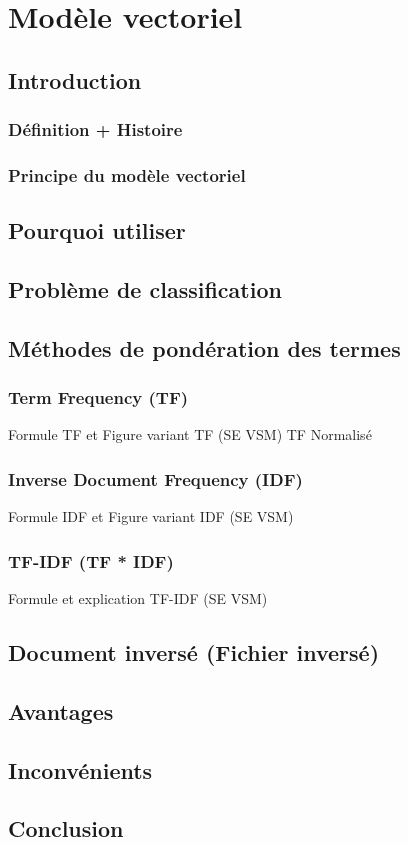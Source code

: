\section{Modèle vectoriel}
\subsection{Introduction}
\subsubsection{Définition + Histoire}
\lipsum[1-2]

\subsubsection{Principe du modèle vectoriel}
\lipsum[1-2]

\subsection{Pourquoi utiliser}
\lipsum[1-2]

\subsection{Problème de classification}
\lipsum[1-2]

\subsection{Méthodes de pondération des termes}
\subsubsection{Term Frequency (TF)}
Formule TF et Figure variant TF (SE VSM)
TF Normalisé

\subsubsection{Inverse Document Frequency (IDF)}
Formule IDF et Figure variant IDF (SE VSM)

\subsubsection{TF-IDF (TF * IDF)}
Formule et explication TF-IDF (SE VSM)

\subsection{Document inversé (Fichier inversé)}
\lipsum[1-2]

\subsection{Avantages}
\lipsum[1-2]

\subsection{Inconvénients}
\lipsum[1-2]

\subsection{Conclusion}
\lipsum[1-2]